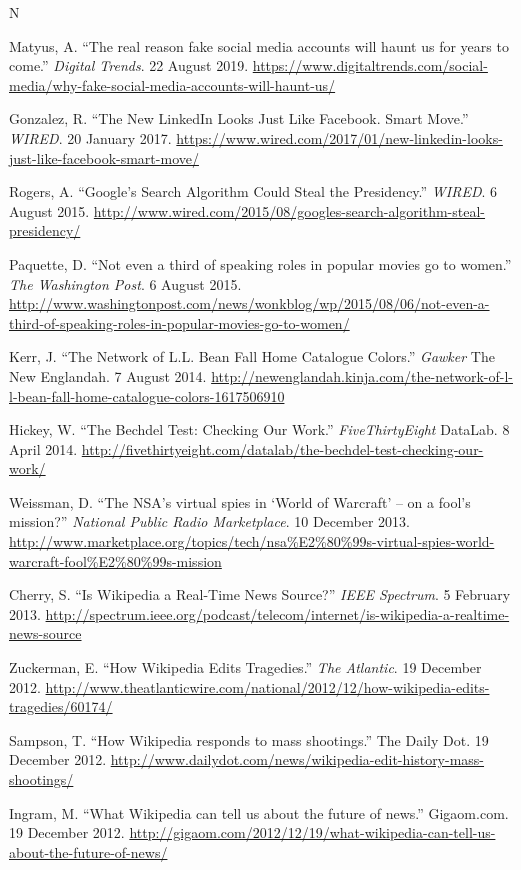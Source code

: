 \documentclass{cv}
\begin{document}
\begin{entries}{N}
		\item Matyus, A. ``The real reason fake social media accounts will haunt us for years to come.'' \textit{Digital Trends}. 22 August 2019. \url{https://www.digitaltrends.com/social-media/why-fake-social-media-accounts-will-haunt-us/}
		\item Gonzalez, R. ``The New LinkedIn Looks Just Like Facebook. Smart Move.'' \textit{WIRED}. 20 January 2017. \url{https://www.wired.com/2017/01/new-linkedin-looks-just-like-facebook-smart-move/}
		\item Rogers, A. ``Google's Search Algorithm Could Steal the Presidency.'' \textit{WIRED}. 6 August 2015. \url{http://www.wired.com/2015/08/googles-search-algorithm-steal-presidency/}
		\item Paquette, D. ``Not even a third of speaking roles in popular movies go to women.'' \textit{The Washington Post}. 6 August 2015. \url{http://www.washingtonpost.com/news/wonkblog/wp/2015/08/06/not-even-a-third-of-speaking-roles-in-popular-movies-go-to-women/}
		\item Kerr, J. ``The Network of L.L. Bean Fall Home Catalogue Colors.'' \textit{Gawker} The New Englandah. 7 August 2014. \url{http://newenglandah.kinja.com/the-network-of-l-l-bean-fall-home-catalogue-colors-1617506910}
		\item Hickey, W. ``The Bechdel Test: Checking Our Work.'' \textit{FiveThirtyEight} DataLab. 8 April 2014. \url{http://fivethirtyeight.com/datalab/the-bechdel-test-checking-our-work/}
		\item Weissman, D. ``The NSA's virtual spies in `World of Warcraft' -- on a fool's mission?'' \textit{National Public Radio Marketplace}. 10 December 2013. \url{http://www.marketplace.org/topics/tech/nsa%E2%80%99s-virtual-spies-world-warcraft-fool%E2%80%99s-mission}
		\item Cherry, S. ``Is Wikipedia a Real-Time News Source?'' \textit{IEEE Spectrum}. 5 February 2013. \url{http://spectrum.ieee.org/podcast/telecom/internet/is-wikipedia-a-realtime-news-source}
		\item Zuckerman, E. ``How Wikipedia Edits Tragedies.'' \textit{The Atlantic}. 19 December 2012. \url{http://www.theatlanticwire.com/national/2012/12/how-wikipedia-edits-tragedies/60174/}
		\item Sampson, T. ``How Wikipedia responds to mass shootings.'' The Daily Dot. 19 December 2012. \url{http://www.dailydot.com/news/wikipedia-edit-history-mass-shootings/}
		\item Ingram, M. ``What Wikipedia can tell us about the future of news.'' Gigaom.com. 19 December 2012. \url{http://gigaom.com/2012/12/19/what-wikipedia-can-tell-us-about-the-future-of-news/}

\end{entries}
\end{document}
